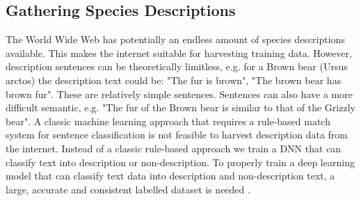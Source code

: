 \documentclass[a4paper, 12pt, oneside]{book} %
\begin{document}
\subsection{Gathering Species Descriptions} \label{par:dataset}
The World Wide Web has potentially an endless amount of species descriptions available.
This makes the internet suitable for harvesting training data.
However, description sentences can be theoretically limitless, e.g. for a Brown bear (Ursus arctos) the description text could be: "The fur is brown", "The brown bear has brown fur".
These are relatively simple sentences.
Sentences can also have a more difficult semantic, e.g. "The fur of the Brown bear is similar to that of the Grizzly bear".
A classic machine learning approach that requires a rule-based match system for sentence classification is not feasible to harvest description data from the internet.
Instead of a classic rule-based approach we train a DNN that can classify text into description or non-description.
To properly train a deep learning model that can classify text data into description and non-description text, a large, accurate and consistent labelled dataset is needed \autocite{munappy_data_2019}.
\end{document}

